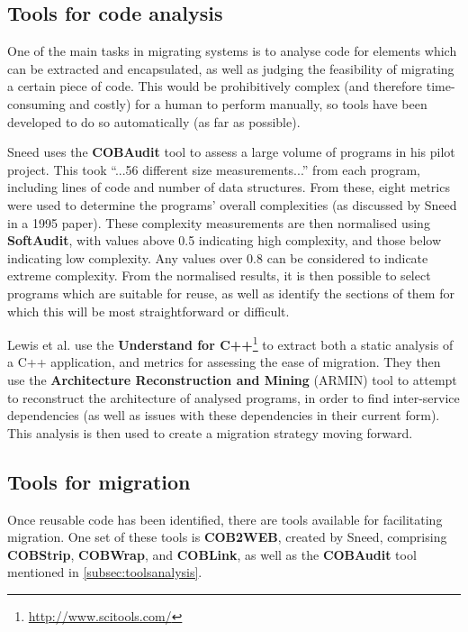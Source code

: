 \documentclass[12pt,journal,compsoc]{IEEEtran}
\begin{document}
\subsection{Tools for code analysis}
\label{subsec:toolsanalysis}
One of the main tasks in migrating systems is to analyse code for elements which can be extracted and encapsulated, as well as judging the feasibility of migrating a certain piece of code. This would be prohibitively complex (and therefore time-consuming and costly) for a human to perform manually, so tools have been developed to do so automatically (as far as possible).

Sneed\cite{Sneed2009} uses the \textbf{COBAudit} tool to assess a large volume of programs in his pilot project. This took ``...56 different size measurements...''\cite{Sneed2009} from each program, including lines of code and number of data structures. From these, eight metrics were used to determine the programs' overall complexities (as discussed by Sneed in a 1995 paper\cite{Sneed1995}). These complexity measurements are then normalised using \textbf{SoftAudit}, with values above 0.5 indicating high complexity, and those below indicating low complexity. Any values over 0.8 can be considered to indicate extreme complexity. From the normalised results, it is then possible to select programs which are suitable for reuse, as well as identify the sections of them for which this will be most straightforward or difficult.

Lewis et al.\cite{Lewis2005a} use the \textbf{Understand for C++}\footnote{\url{http://www.scitools.com/}} to extract both a static analysis of a C++ application, and metrics for assessing the ease of migration. They then use the \textbf{Architecture Reconstruction and Mining} (ARMIN)\cite{O'Brien2005} tool to attempt to reconstruct the architecture of analysed programs, in order to find inter-service dependencies (as well as issues with these dependencies in their current form). This analysis is then used to create a migration strategy moving forward.

\subsection{Tools for migration}
\label{subsec:toolsmigration}
Once reusable code has been identified, there are tools available for facilitating migration. One set of these tools is \textbf{COB2WEB}, created by Sneed\cite{Sneed2008}, comprising \textbf{COBStrip}, \textbf{COBWrap}, and \textbf{COBLink}, as well as the \textbf{COBAudit} tool mentioned in \autoref{subsec:toolsanalysis}.
\end{document}
